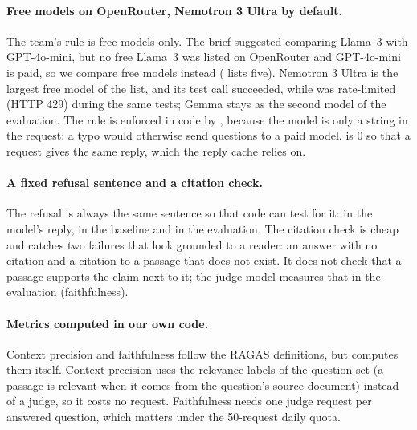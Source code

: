 \paragraph{Free models on OpenRouter, Nemotron 3 Ultra by default.}
The team's rule is free models only. The brief suggested comparing Llama~3 with GPT-4o-mini, but no
free Llama~3 was listed on OpenRouter and GPT-4o-mini is paid, so we compare free models instead
( lists five). Nemotron 3 Ultra is the largest free model of the list, and its test
call succeeded, while  was rate-limited (HTTP 429) during the same tests;
Gemma stays as the second model of the evaluation. The rule is enforced in code by
, because the model is only a string in the request: a typo would otherwise send
questions to a paid model.  is 0 so that a request gives the same reply, which the
reply cache relies on.

\paragraph{A fixed refusal sentence and a citation check.}
The refusal is always the same sentence so that code can test for it: in the model's reply, in the
 baseline and in the evaluation. The citation check is cheap and catches two failures
that look grounded to a reader: an answer with no citation and a citation to a passage that does not
exist. It does not check that a passage supports the claim next to it; the judge model measures
that in the evaluation (faithfulness).

\paragraph{Metrics computed in our own code.}
Context precision and faithfulness follow the RAGAS definitions, but  computes
them itself. Context precision uses the relevance labels of the question set (a passage is relevant
when it comes from the question's source document) instead of a judge, so it costs no request.
Faithfulness needs one judge request per answered question, which matters under the 50-request
daily quota.
